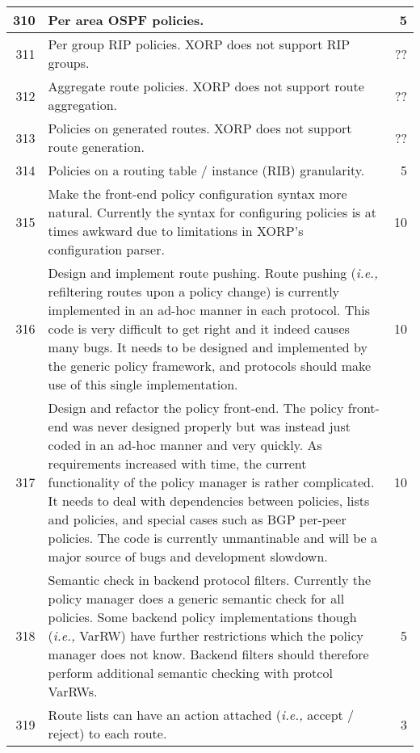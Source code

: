 \documentclass[letterpaper]{article}
\begin{document}
\begin{center}
\begin{supertabular}{|r |p{12cm} |r|}
310 &
Per area OSPF policies.
&
5 \\
\hline

311 &
Per group RIP policies.  XORP does not support RIP groups.
&
?? \\
\hline

312 &
Aggregate route policies.  XORP does not support route aggregation.
&
?? \\
\hline

313 &
Policies on generated routes.  XORP does not support route generation.
&
?? \\
\hline

314 &
Policies on a routing table / instance (RIB) granularity.
&
5 \\
\hline

315 &
Make the front-end policy configuration syntax more natural.  Currently the
syntax for configuring policies is at times awkward due to limitations in XORP's
configuration parser.
& 10 \\
\hline

316 &
Design and implement route pushing.  Route pushing ({\em i.e.,} refiltering
routes upon a policy change) is currently implemented in an ad-hoc manner in
each protocol.  This code is very difficult to get right and it indeed causes
many bugs.  It needs to be designed and implemented by the generic policy
framework, and protocols should make use of this single implementation.
& 10 \\
\hline

317 &
Design and refactor the policy front-end.  The policy front-end was never
designed properly but was instead just coded in an ad-hoc manner and very
quickly.  As requirements increased with time, the current functionality of the
policy manager is rather complicated.  It needs to deal with dependencies
between policies, lists and policies, and special cases such as BGP per-peer
policies.  The code is currently unmantinable and will be a major source of bugs
and development slowdown.
& 10 \\
\hline

318 &
Semantic check in backend protocol filters.  Currently the policy manager does a
generic semantic check for all policies.  Some backend policy implementations
though ({\em i.e.,} VarRW) have further restrictions which the policy manager
does not know.  Backend filters should therefore perform additional semantic
checking with protcol VarRWs.
& 5 \\
\hline

319 &
Route lists can have an action attached ({\em i.e.,} accept / reject) to each
route.
& 3 \\

\end{supertabular}
\end{center}
\end{document}
